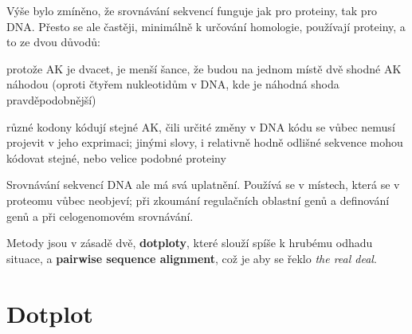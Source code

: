 \documentclass[DIV=8]{scrreprt}
\begin{document}
Výše bylo zmíněno, že srovnávání sekvencí funguje jak pro proteiny, tak pro DNA. Přesto se ale častěji, minimálně k určování homologie, používají proteiny, a to ze dvou důvodů:
\begin{myEnumerate}[nosep]
    \item protože AK je dvacet, je menší šance, že budou na jednom místě dvě shodné AK náhodou (oproti čtyřem nukleotidům v DNA, kde je náhodná shoda pravděpodobnější)
    \item různé kodony kódují stejné AK, čili určité změny v DNA kódu se vůbec nemusí projevit v jeho exprimaci; jinými slovy, i relativně hodně odlišné sekvence mohou kódovat stejné, nebo velice podobné proteiny
\end{myEnumerate}



Srovnávání sekvencí DNA ale má svá uplatnění. Používá se v místech, která se v proteomu vůbec neobjeví; při zkoumání regulačních oblastní genů a definování genů a při celogenomovém srovnávání.

Metody jsou v zásadě dvě, \textbf{dotploty}, které slouží spíše k hrubému odhadu situace, a \textbf{pairwise sequence alignment}, což je aby se řeklo \emph{the real deal}.

\section{Dotplot} \label{Dotplot} \FloatBarrier
\end{document}
